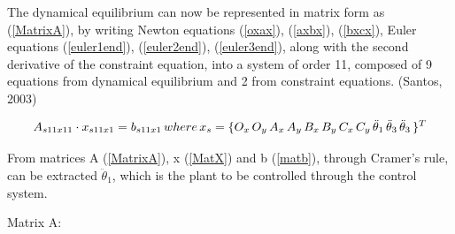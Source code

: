  The dynamical equilibrium can now be represented in matrix form as (\ref{MatrixA}), by writing Newton equations (\ref{oxax}),  (\ref{axbx}), (\ref{bxcx}), Euler equations  (\ref{euler1end}),  (\ref{euler2end}), (\ref{euler3end}), along with the second derivative of the constraint equation, into a system of order 11, composed of 9 equations from dynamical equilibrium and 2 from constraint equations. (Santos, 2003) \cite{santos2001dinamica}

 \begin{equation} \label{matA11}
{A}_{s11x11}\cdot x_{s11x1} = b_{s11x1}
\\\, where\\\, x_s = \{ O_x\, O_y\,A_x\,A_y\,B_x\,B_y\,C_x\,C_y\, \ddot\theta_1\,\ddot\theta_3\,\ddot\theta_3\, \}^T
\end{equation}
 
 From matrices A (\ref{MatrixA}), x (\ref{MatX}) and b (\ref{matb}), through Cramer's rule, can be extracted  \( \ddot\theta_1 \), which is the plant to be controlled through the control system. 

Matrix A:

